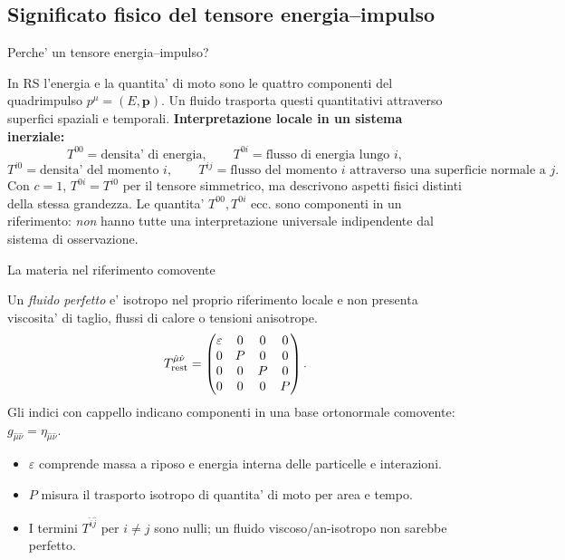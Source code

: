 \subsection{Significato fisico del tensore energia--impulso}

\begin{frame}[t]{Perche' un tensore energia--impulso?}\small\raggedright

In RS l'energia e la quantita' di moto sono le quattro componenti del quadrimpulso $p^\mu=(E,\mathbf p)$. Un fluido trasporta questi quantitativi attraverso superfici spaziali e temporali.
\medskip
\textbf{Interpretazione locale in un sistema inerziale:}
\[
T^{00}=\text{densita' di energia},\qquad
T^{0i}=\text{flusso di energia lungo }i,
\]
\[
T^{i0}=\text{densita' del momento }i,\qquad
T^{ij}=\text{flusso del momento }i\text{ attraverso una superficie normale a }j.
\]
Con $c=1$, $T^{0i}=T^{i0}$ per il tensore simmetrico, ma descrivono aspetti fisici distinti della stessa grandezza.
\medskip
Le quantita' $T^{00},T^{0i}$ ecc. sono componenti in un riferimento: \emph{non} hanno tutte una interpretazione universale indipendente dal sistema di osservazione.

\end{frame}

\begin{frame}[t]{La materia nel riferimento comovente}\small\raggedright

Un \emph{fluido perfetto} e' isotropo nel proprio riferimento locale e non presenta viscosita' di taglio, flussi di calore o tensioni anisotrope.
\[
T^{\hat\mu\hat\nu}_{\rm rest}
=\begin{pmatrix}
\varepsilon&0&0&0\\
0&P&0&0\\
0&0&P&0\\
0&0&0&P
\end{pmatrix}.
\]
Gli indici con cappello indicano componenti in una base ortonormale comovente: $g_{\hat\mu\hat\nu}=\eta_{\hat\mu\hat\nu}$.
\begin{itemize}
\item $\varepsilon$ comprende massa a riposo e energia interna delle particelle e interazioni.
\item $P$ misura il trasporto isotropo di quantita' di moto per area e tempo.
\item I termini $T^{\hat i\hat j}$ per $i\ne j$ sono nulli; un fluido viscoso/an-isotropo non sarebbe perfetto.
\end{itemize}

\end{frame}

